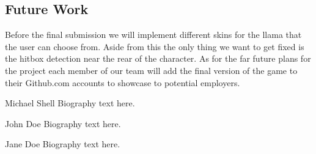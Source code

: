 \documentclass[10pt,conference,onecolumn,compsoc]{IEEEtran}
\begin{document}
\subsection{Future Work}
Before the final submission we will implement different skins for the llama that the user can choose from. Aside from this the only thing we want to get fixed is the hitbox detection near the rear of the character. As for the far future plans for the project each member of our team will add the final version of the game to their Github.com accounts to showcase to potential employers.


\begin{IEEEbiography}{Michael Shell}
Biography text here.
\end{IEEEbiography}

\begin{IEEEbiographynophoto}{John Doe}
Biography text here.
\end{IEEEbiographynophoto}

\begin{IEEEbiographynophoto}{Jane Doe}
Biography text here.
\end{IEEEbiographynophoto}
\end{document}
